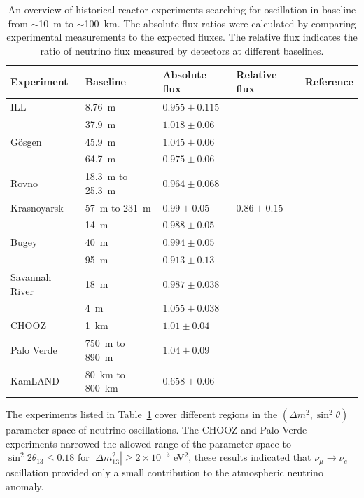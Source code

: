     \begin{table}[!htbp]
    \centering
    \caption[An overview of historical reactor oscillation experiments]{An overview of historical reactor experiments searching for \nuebar oscillation in baseline from $\sim$10~m to $\sim$100~km.
    The absolute flux ratios were calculated by comparing experimental measurements to the expected fluxes.
    The relative flux indicates the ratio of neutrino flux measured by detectors at different baselines.}
    \begin{tabular}{lllll}
    \hline
    \hline
    Experiment  & Baseline   & Absolute flux  & Relative flux    & Reference   \\ 
    \hline
    ILL     & 8.76~m  & $0.955\pm 0.115$  &  & \cite{bib:kwon1981}  \\
    \hline
        & 37.9~m   & $1.018\pm 0.06$  &   &   \\
    G\"osgen  & 45.9~m  & $1.045\pm 0.06$  &   & \cite{bib:gosgen}  \\
        & 64.7~m    & $0.975\pm 0.06$  &   &   \\
    \hline
    Rovno     & 18.3~m to 25.3~m     & $0.964\pm 0.068$  &   & \cite{bib:Afonin1987}  \\
    \hline
    Krasnoyarsk     &  57~m to 231~m    & $0.99\pm 0.05$  & $0.86\pm 0.15$  &  \cite{bib:Vidyakin1994} \\
    \hline
        & 14~m & $0.988\pm 0.05$  &   &   \\
    Bugey   & 40~m  & $0.994\pm 0.05$  &   &  \cite{bib:Bugey} \\
        & 95~m  & $0.913\pm 0.13$  &   &   \\
    \hline
    Savannah River  &  18~m & $0.987\pm 0.038$ &    & \cite{bib:Greenwood1996} \\
        &4~m    & $1.055\pm 0.038$  &   &   \\
    \hline
    CHOOZ   & 1~km     & $1.01\pm 0.04$   &   & \cite{bib:chooz98, bib:Chooz99, bib:chooz03}  \\
    \hline
    Palo Verde   &  750~m to 890~m & $1.04\pm 0.09$ &   &  \cite{bib:palo01, bib:palo1999, bib:palo2000} \\
    \hline
    KamLAND & 80~km to 800~km  &  $0.658\pm 0.06$ &   & \cite{bib:KamLAND03, bib:kamland04}  \\
    \hline
    \end{tabular}
    \label{tab:history}
    \end{table}
 
    The experiments listed in Table~\ref{tab:history} cover different regions in the $(\Delta m^2, \sin^2\theta)$ parameter space of neutrino oscillations.
    The CHOOZ and Palo Verde experiments narrowed the allowed range of the parameter space to $\sin^2 2\theta_{13} \le 0.18$ for $|\Delta m^2_{13}|\ge 2\times 10^{-3}$ eV$^2$, these results indicated that $\nu_\mu \rightarrow \nu_e$ oscillation provided only a small contribution to the atmospheric neutrino anomaly.
    
